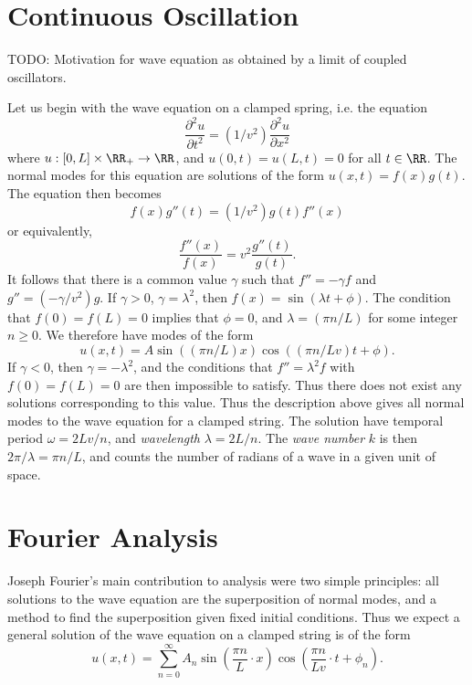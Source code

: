 \section{Continuous Oscillation}

TODO: Motivation for wave equation as obtained by a limit of coupled oscillators.

Let us begin with the wave equation on a clamped spring, i.e. the equation
%
\[ \frac{\partial^2 u}{\partial t^2} = (1/v^2) \frac{\partial^2 u}{\partial x^2} \]
%
where $u: [0,L] \times \RR_+ \to \RR$, and $u(0,t) = u(L,t) = 0$ for all $t \in \RR$. The normal modes for this equation are solutions of the form $u(x,t) = f(x) g(t)$. The equation then becomes
%
\[ f(x) g''(t) = (1/v^2) g(t) f''(x) \]
%
or equivalently,
%
\[ \frac{f''(x)}{f(x)} = v^2 \frac{g''(t)}{g(t)}. \]
%
It follows that there is a common value $\gamma$ such that $f'' = -\gamma f$ and $g'' = (-\gamma / v^2) g$. If $\gamma > 0$, $\gamma = \lambda^2$, then $f(x) = \sin (\lambda t + \phi)$. The condition that $f(0) = f(L) = 0$ implies that $\phi = 0$, and $\lambda = (\pi n / L)$ for some integer $n \geq 0$. We therefore have modes of the form
%
\[ u(x,t) = A \sin( (\pi n / L) x ) \cos( (\pi n / L v) t + \phi ). \]
%
If $\gamma < 0$, then $\gamma = -\lambda^2$, and the conditions that $f'' = \lambda^2 f$ with $f(0) = f(L) = 0$ are then impossible to satisfy. Thus there does not exist any solutions corresponding to this value. Thus the description above gives all normal modes to the wave equation for a clamped string. The solution have temporal period $\omega = 2Lv/n$, and \emph{wavelength} $\lambda = 2 L / n$. The \emph{wave number} $k$ is then $2\pi / \lambda = \pi n / L$, and counts the number of radians of a wave in a given unit of space.

\section{Fourier Analysis}

Joseph Fourier's main contribution to analysis were two simple principles: all solutions to the wave equation are the superposition of normal modes, and a method to find the superposition given fixed initial conditions. Thus we expect a general solution of the wave equation on a clamped string is of the form
%
\[ u(x,t) = \sum_{n = 0}^\infty A_n \sin \left( \frac{\pi n}{L} \cdot x \right) \cos \left( \frac{\pi n}{L v} \cdot t + \phi_n \right). \]

